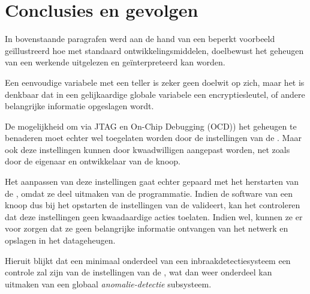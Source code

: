 \section{Conclusies en gevolgen}

In bovenstaande paragrafen werd aan de hand van een beperkt voorbeeld
ge\"illustreerd hoe met standaard ontwikkelingsmiddelen, doelbewust het
geheugen van een werkende \mcu uitgelezen en ge\"interpreteerd kan worden.

Een eenvoudige variabele met een teller is zeker geen doelwit op zich, maar het
is denkbaar dat in een gelijkaardige globale variabele een encryptiesleutel, of
andere belangrijke informatie opgeslagen wordt.

De mogelijkheid om via JTAG en On-Chip Debugging (OCD)) het geheugen te
benaderen moet echter wel toegelaten worden door de instellingen van de \mcu.
Maar ook deze instellingen kunnen door kwaadwilligen aangepast worden, net
zoals door de eigenaar en ontwikkelaar van de knoop.

Het aanpassen van deze instellingen gaat echter gepaard met het herstarten van
de \mcu, omdat ze deel uitmaken van de programmatie. Indien de software van een
knoop dus bij het opstarten de instellingen van de \mcu valideert, kan het
controleren dat deze instellingen geen kwaadaardige acties toelaten. Indien
wel, kunnen ze er voor zorgen dat ze geen belangrijke informatie ontvangen van
het netwerk en opslagen in het datageheugen.

Hieruit blijkt dat een minimaal onderdeel van een inbraakdetectiesysteem een
controle zal zijn van de instellingen van de \mcu, wat dan weer onderdeel kan
uitmaken van een globaal \emph{anomalie-detectie} subsysteem.
